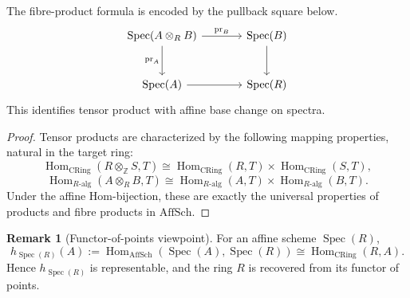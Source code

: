 \documentclass[12pt, a4paper]{article}
\theoremstyle{definition}
\newtheorem{remark}[theorem]{Remark}
\DeclareMathOperator{\Spec}{Spec}
\DeclareMathOperator{\Hom}{Hom}
\newcommand{\AffSch}{\mathrm{AffSch}}
\newcommand{\CRing}{\mathrm{CRing}}
\begin{document}
The fibre-product formula is encoded by the pullback square below.
\[
\begin{tikzcd}[column sep=large, row sep=large]
\Spec(A\otimes_R B) \arrow[r, "\mathrm{pr}_B"] \arrow[d, "\mathrm{pr}_A"'] & \Spec(B) \arrow[d] \\
\Spec(A) \arrow[r] & \Spec(R)
\end{tikzcd}
\]
This identifies tensor product with affine base change on spectra.

\begin{proof}
Tensor products are characterized by the following mapping properties, natural in the target ring:
\[
\Hom_{\CRing}(R\otimes_{\mathbb Z}S,T)
\cong
\Hom_{\CRing}(R,T)\times \Hom_{\CRing}(S,T),
\]
\[
\Hom_{R\text{-alg}}(A\otimes_R B,T)
\cong
\Hom_{R\text{-alg}}(A,T)\times \Hom_{R\text{-alg}}(B,T).
\]
Under the affine Hom-bijection, these are exactly the universal properties of products and fibre products in $\AffSch$.
\end{proof}

\begin{remark}[Functor-of-points viewpoint]
For an affine scheme $\Spec(R)$,
\[
\boxed{h_{\Spec(R)}(A):=\Hom_{\AffSch}(\Spec(A),\Spec(R))\cong \Hom_{\CRing}(R,A).}
\]
Hence $h_{\Spec(R)}$ is representable, and the ring $R$ is recovered from its functor of points.
\end{remark}
\end{document}
